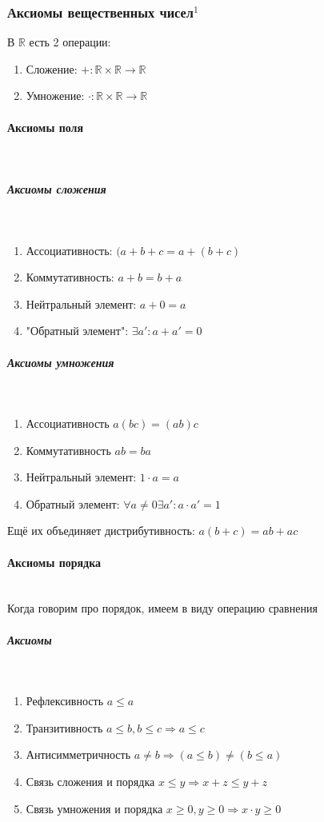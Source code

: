 \documentclass{article}
\let\vanillaparagraph\paragraph
\let\vanillasubparagraph\subparagraph
\renewcommand{\paragraph}[1]{\vanillaparagraph{#1}\mbox{}\\}
\renewcommand{\subparagraph}[1]{\vanillasubparagraph{#1}\mbox{}\\}
\begin{document}
\subsubsection{Аксиомы вещественных чисел\texorpdfstring{$^1$}{}}
В $\mathbb{R}$ есть 2 операции:
\begin{enumerate}
    \item Сложение: $+: \mathbb{R} \times \mathbb{R} \rightarrow \mathbb{R}$
    \item Умножение: $\cdot: \mathbb{R} \times \mathbb{R} \rightarrow \mathbb{R}$
\end{enumerate}

\paragraph{Аксиомы поля}
\subparagraph{Аксиомы сложения}
\begin{enumerate}
    \item Ассоциативность: $(a + b + c = a + (b + c)$
    \item Коммутативность: $a + b = b + a$
    \item Нейтральный элемент: $a + 0 = a$
    \item "Обратный элемент": $\exists a' : a + a' = 0$
\end{enumerate}

\subparagraph{Аксиомы умножения}
\begin{enumerate}
    \item Ассоциативность $a(bc) = (ab)c$
    \item Коммутативность $ab = ba$
    \item Нейтральный элемент: $1 \cdot a = a$
    \item Обратный элемент: $\forall a \ne 0 \exists a' : a\cdot a' = 1$
\end{enumerate}

Ещё их объединяет дистрибутивность: $a(b+c) = ab + ac$

\paragraph{Аксиомы порядка}
Когда говорим про порядок, имеем в виду операцию сравнения
\subparagraph{Аксиомы}
\begin{enumerate}
    \item Рефлексивность $a \le a$
    \item Транзитивность $a \le b, b \le c \Rightarrow a \le c$
    \item Антисимметричность $a \ne b \Rightarrow (a \le b) \ne (b \le a)$
    \item Связь сложения и порядка $x \le y \Rightarrow x + z \le y + z$
    \item Связь умножения и порядка $x \ge 0, y \ge 0 \Rightarrow x \cdot y \ge 0$
\end{enumerate}
\end{document}
